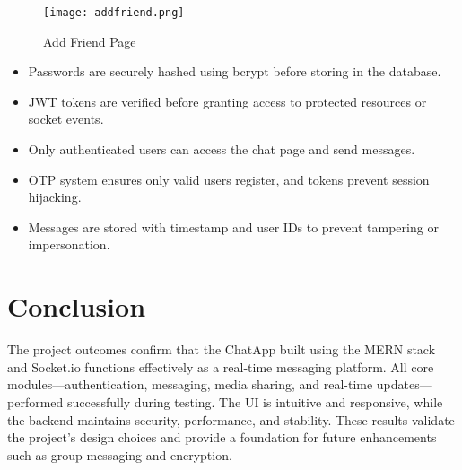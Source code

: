 \documentclass[12pt,a4paper]{report}
\begin{document}
\begin{figure}[H]
    \centering
    \texttt{[image: addfriend.png]}
    \caption{Add Friend Page}
\end{figure}

\begin{itemize}
    \item Passwords are securely hashed using bcrypt before storing in the database.
    \item JWT tokens are verified before granting access to protected resources or socket events.
    \item Only authenticated users can access the chat page and send messages.
    \item OTP system ensures only valid users register, and tokens prevent session hijacking.
    \item Messages are stored with timestamp and user IDs to prevent tampering or impersonation.
\end{itemize}

\section{Conclusion}

The project outcomes confirm that the ChatApp built using the MERN stack and Socket.io functions effectively as a real-time messaging platform. All core modules—authentication, messaging, media sharing, and real-time updates—performed successfully during testing. The UI is intuitive and responsive, while the backend maintains security, performance, and stability. These results validate the project’s design choices and provide a foundation for future enhancements such as group messaging and encryption.


\newpage

\end{document}

